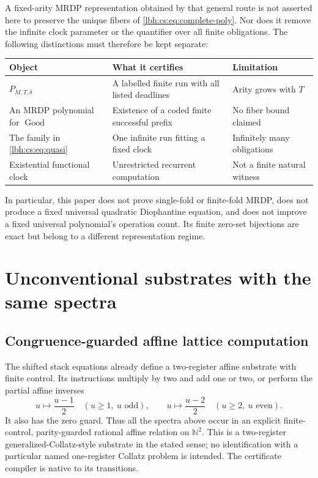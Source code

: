\documentclass[11pt,letterpaper]{article}
\theoremstyle{definition}
\theoremstyle{remark}
\newcommand{\N}{\mathbb N}
\newcommand{\1}{\mathbf 1}
\newcommand{\srctag}[1]{\texorpdfstring{\hspace{0.4em}{\normalfont\small\color{accent}[source #1]}}{ [source #1]}}
\begin{document}
A fixed-arity MRDP representation obtained by that general route is not
asserted here to preserve the unique fibers of
\eqref{lbh:cs:eq:complete-poly}. Nor does it remove the infinite clock parameter
or the quantifier over all finite obligations. The following distinctions
must therefore be kept separate:
\begin{center}\small
\begin{tabularx}{\textwidth}{@{}p{}Xp{}@{}}
\toprule
Object & What it certifies & Limitation\\
\midrule
$P_{M,T,\delta}$ & A labelled finite run with all listed deadlines & Arity grows with $T$\\
An MRDP polynomial for $\operatorname{Good}$ & Existence of a coded finite successful prefix & No fiber bound claimed\\
The family in \eqref{lbh:cs:eq:quasi} & One infinite run fitting a fixed clock & Infinitely many obligations\\
Existential functional clock & Unrestricted recurrent computation & Not a finite natural witness\\
\bottomrule
\end{tabularx}
\end{center}

In particular, this paper does not prove single-fold or finite-fold MRDP,
does not produce a fixed universal quadratic Diophantine equation, and
does not improve a fixed universal polynomial's operation count. Its
finite zero-set bijections are exact but belong to a different representation
regime.

\section{Unconventional substrates with the same spectra\srctag{12}}\label{lbh:cs:sec:substrates}

\subsection{Congruence-guarded affine lattice computation}
The shifted stack equations already define a two-register affine substrate
with finite control. Its instructions multiply by two and add one or two,
or perform the partial affine inverses
\[
 u\mapsto\frac{u-1}{2}\quad(u\geq1,\ u\text{ odd}),\qquad
 u\mapsto\frac{u-2}{2}\quad(u\geq2,\ u\text{ even}).
\]
It also has the zero guard. Thus all the spectra above occur in an explicit
finite-control, parity-guarded rational affine relation on $\N^2$.
This is a two-register generalized-Collatz-style substrate in the stated
sense; no identification with a particular named one-register Collatz
problem is intended. The certificate compiler is native to its transitions.
\end{document}
